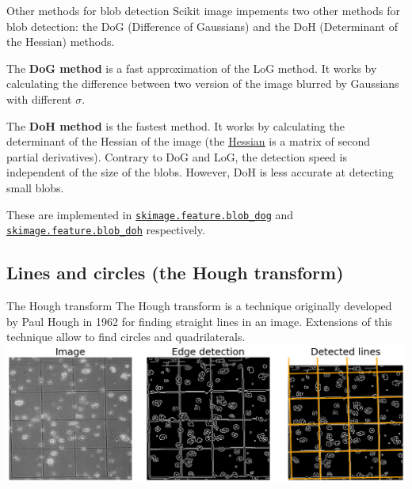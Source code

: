 \documentclass[9pt, aspectratio=169]{beamer}
\begin{document}
\begin{frame}
\begin{columns}
\begin{column}{.3\textwidth}
{            }
        \end{column}
    \end{columns}
\end{frame}

\begin{frame}
    {Other methods for blob detection}
    Scikit image impements two other methods for blob detection: the DoG (Difference of Gaussians) and the DoH (Determinant of the Hessian) methods.

    \pause

    The \textbf{DoG method} is a fast approximation of the LoG method. It works by calculating the difference between two version of the image blurred by Gaussians with different $\sigma$.

    The \textbf{DoH method} is the fastest method. It works by calculating the determinant of the Hessian of the image (the \href{https://en.wikipedia.org/wiki/Hessian\_matrix}{\underline{Hessian}} is a matrix of second partial derivatives).
    Contrary to DoG and LoG, the detection speed is independent of the size of the blobs. However, DoH is less accurate at detecting small blobs.

    \pause
    These are implemented in \href{https://scikit-image.org/docs/dev/api/skimage.feature.html\#skimage.feature.blob\_dog}{\texttt{\underline{skimage.feature.blob\_dog}}} and \href{https://scikit-image.org/docs/dev/api/skimage.feature.html\#skimage.feature.blob\_doh}{\texttt{\underline{skimage.feature.blob\_doh}}} respectively.
\end{frame}

\subsection{Lines and circles (the Hough transform)}

\begin{frame}
    {The Hough transform}
    The Hough transform is a technique originally developed by Paul Hough in 1962 for finding straight lines in an image. Extensions of this technique allow to find circles and quadrilaterals.
    \centering
    \includegraphics[width=.85\textwidth]{hough_line_overview.png}
\end{frame}
\end{document}
